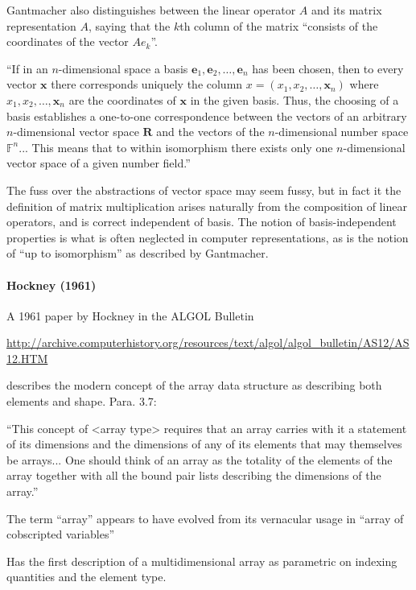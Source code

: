Gantmacher also distinguishes \cite[pp. 54-56]{Gantmacher1960} between the linear operator $A$ and its matrix representation $A$, saying that the $k$th column of the matrix ``consists of the coordinates of the vector $Ae_k$''.

``If in an $n$-dimensional space a basis $\mathbf e_1, \mathbf e_2, \dots, \mathbf e_n$ has been chosen, then to every vector $\mathbf x$ there corresponds uniquely the column $x = (x_1, x_2, \dots, \mathbf x_n)$ where $x_1, x_2, \dots, \mathbf x_n$ are the coordinates of $\mathbf x$ in the given basis. Thus, the choosing of a basis establishes a one-to-one correspondence between the vectors of an arbitrary $n$-dimensional vector space $\mathbf R$ and the vectors of the $n$-dimensional number space $\mathbb F^n$... This means that to within isomorphism there exists only one $n$-dimensional vector space of a given number field.''

The fuss over the abstractions of vector space may seem fussy, but in fact it the definition of matrix multiplication arises naturally from the composition of linear operators, and is correct independent of basis. The notion of basis-independent properties is what is often neglected in computer representations, as is the notion of ``up to isomorphism'' as described by Gantmacher.



\paragraph{Hockney (1961)}

A 1961 paper by Hockney in the ALGOL Bulletin

\url{http://archive.computerhistory.org/resources/text/algol/algol_bulletin/AS12/AS12.HTM}

describes the modern concept of the array data structure as describing
both elements and shape. Para. 3.7:

``This concept of <array type> requires that an array carries with it a
statement of its dimensions and the dimensions of any of its elements
that may themselves be arrays... One should think of an array as the
totality of the elements of the array together with all the bound pair
lists describing the dimensions of the array.''

The term ``array'' appears to have evolved from its vernacular usage in ``array of cobscripted variables''

Has the first description of a multidimensional array as parametric on indexing quantities and the element type.





